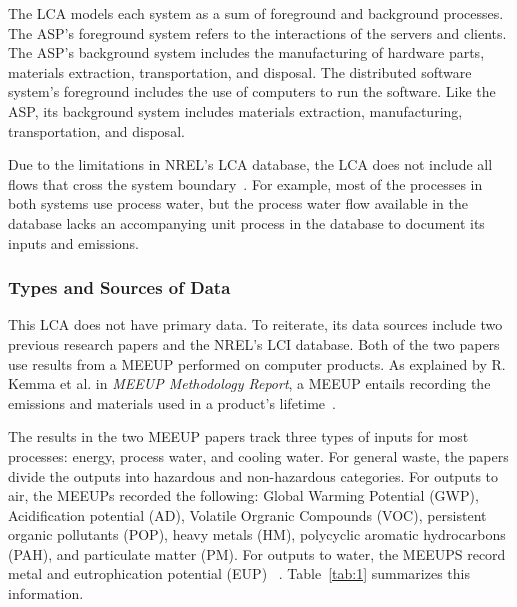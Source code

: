 \documentclass[final,journal,10pt,letterpaper,oneside,twocolumn,compsoc]%
{IEEEtran}
\begin{document}
The LCA models each system as a sum of foreground and background processes. The
ASP's foreground system refers to the interactions of the servers and
clients. The ASP's background system includes the manufacturing
of hardware parts, materials
extraction, transportation, and disposal. The distributed software system's
foreground
includes the use of computers to run the software. Like the ASP, its
background
system includes materials extraction, manufacturing, transportation, and
disposal.

Due to the limitations in NREL's LCA database, the LCA does not include all
flows that cross the system boundary~\cite{database}. For example, most of the
processes in
both systems use process water, but the process water flow available in the
database lacks an accompanying unit process in the database to document its
inputs and emissions.

\subsubsection{Types and Sources of Data}
This LCA does not have primary data. To reiterate, its data sources include two
previous research papers
and the NREL's LCI database. Both of the two papers use results from a
MEEUP performed on
computer products. As explained by R. Kemma et al. in \textit{MEEUP Methodology
Report}, a MEEUP entails recording the emissions and materials used
in a product's lifetime~\cite{meeup}.

The results in the two MEEUP papers track
three types of inputs for most processes: energy, process
water, and cooling water. For general waste, the papers divide the outputs
into hazardous and non-hazardous categories. For outputs to air, the MEEUPs
recorded the following: Global Warming Potential (GWP), Acidification
potential (AD), Volatile Orgranic Compounds (VOC), persistent organic
pollutants (POP), heavy
metals (HM), polycyclic aromatic hydrocarbons (PAH), and particulate matter
(PM). For outputs to
water, the MEEUPS record metal and eutrophication potential (EUP)~\cite{client}
\cite{desktop}. Table~\ref{tab:1} summarizes this information.
\end{document}
